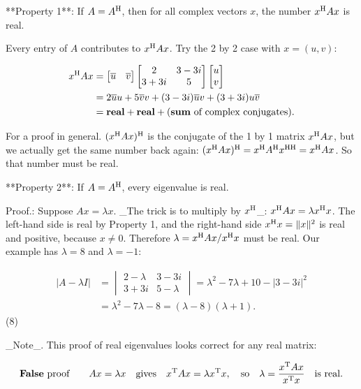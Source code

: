 

**Property 1**: If \(A=A^{\rm H}\), then for all complex vectors \(x\), the number \(x^{\rm H}Ax\) is real.

Every entry of \(A\) contributes to \(x^{\rm H}Ax\). Try the 2 by 2 case with \(x=(u,v)\):

\[\begin{split} x^{\rm H}Ax&=\begin{bmatrix}\overline{ u}&\overline{v}\end{bmatrix}\begin{bmatrix}2&3-3i\\ 3+3i&5\end{bmatrix}\begin{bmatrix}u\\ v\end{bmatrix}\\ &=2\overline{u}u+5\overline{v}v+(3-3i)\overline{u}v+(3+3i)u\overline{v}\\ &=\mathbf{real}+\mathbf{real}+(\mathbf{sum}\text{ of complex conjugates}).\end{split}\]

For a proof in general. \((x^{\rm H}Ax)^{\rm H}\) is the conjugate of the 1 by 1 matrix \(x^{\rm H}Ax\), but we actually get the same number back again: \((x^{\rm H}Ax)^{\rm H}=x^{\rm H}A^{\rm H}x^{\rm HH}=x^{\rm H}Ax\). So that number must be real.

**Property 2**: If \(A=A^{\rm H}\), every eigenvalue is real.

Proof.: Suppose \(Ax=\lambda x\). _The trick is to multiply by \(x^{\rm H}\)_: \(x^{\rm H}Ax=\lambda x^{\rm H}x\). The left-hand side is real by Property 1, and the right-hand side \(x^{\rm H}x=\|x\|^{2}\) is real and positive, because \(x\neq 0\). Therefore \(\lambda=x^{\rm H}Ax/x^{\rm H}x\) must be real. Our example has \(\lambda=8\) and \(\lambda=-1\):

\[\begin{split}|A-\lambda I|&=\begin{vmatrix}2-\lambda&3-3i\\ 3+3i&5-\lambda\end{vmatrix}=\lambda^{2}-7\lambda+10-|3-3i|^{2}\\ &=\lambda^{2}-7\lambda-8=(\lambda-8)(\lambda+1).\end{split}\] (8)

_Note_. This proof of real eigenvalues looks correct for any real matrix:

\[\begin{split}\mathbf{False}\text{ proof}\qquad Ax=\lambda x\quad \text{gives}\quad x^{\rm T}Ax=\lambda x^{\rm T}x,\quad\text{so}\quad\lambda= \frac{x^{\rm T}Ax}{x^{\rm T}x}\quad\text{is real}.\end{split}\]

